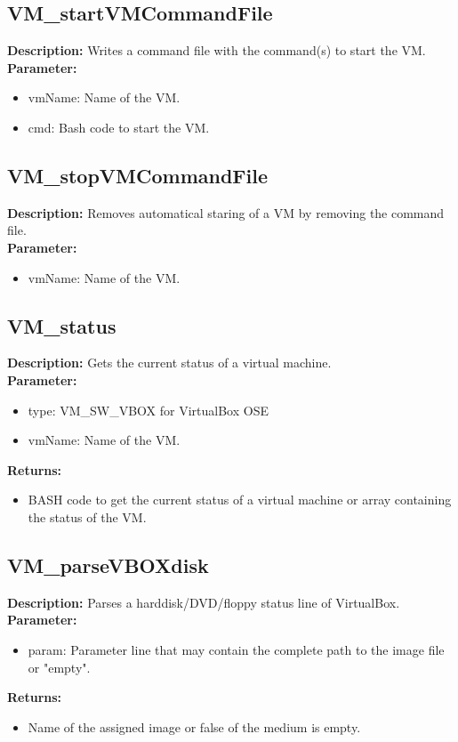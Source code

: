 \subsection{VM\_startVMCommandFile}
\textbf{Description:} Writes a command file with the command(s) to start the VM.\\
\textbf{Parameter:}
\begin{itemize}
\item vmName: Name of the VM.
\item cmd: Bash code to start the VM.
\end{itemize}

\subsection{VM\_stopVMCommandFile}
\textbf{Description:} Removes automatical staring of a VM by removing the command file.\\
\textbf{Parameter:}
\begin{itemize}
\item vmName: Name of the VM.
\end{itemize}

\subsection{VM\_status}
\textbf{Description:} Gets the current status of a virtual machine.\\
\textbf{Parameter:}
\begin{itemize}
\item type: VM\_SW\_VBOX for VirtualBox OSE
\item vmName: Name of the VM.
\end{itemize}
\textbf{Returns:}
\begin{itemize}
\item BASH code to get the current status of a virtual machine or array containing the status of the VM.
\end{itemize}

\subsection{VM\_parseVBOXdisk}
\textbf{Description:} Parses a harddisk/DVD/floppy status line of VirtualBox.\\
\textbf{Parameter:}
\begin{itemize}
\item param: Parameter line that may contain the complete path to the image file or "empty".
\end{itemize}
\textbf{Returns:}
\begin{itemize}
\item Name of the assigned image or false of the medium is empty.
\end{itemize}


